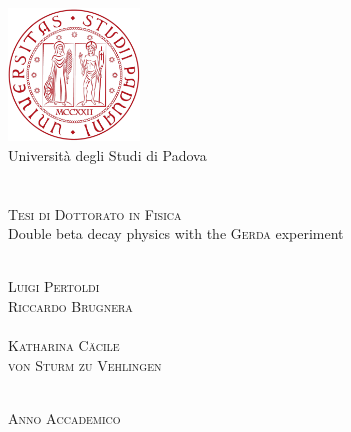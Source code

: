 \begin{titlepage}
  \thispagestyle{empty}
  \begin{center}
  \includegraphics[width=3.5cm]{img/unipd-logo.pdf} \\
  \vspace{0.5cm}
  {\Large Universit\`a degli Studi di Padova} \\
  \hrulefill \\
   \\
  \vspace{2cm}
  \textsc{\large Tesi di Dottorato in Fisica} \\
  \vspace{3cm}
  \huge{Double beta decay physics with the \textsc{Gerda} experiment}
  \end{center}
  \vspace{3cm}
  \begin{multicols}{2}
  \large
  \noindent
   \\
  \textsc{Luigi Pertoldi}
  \columnbreak
  \flushright
   \\
  \textsc{Riccardo Brugnera} \\
  \vspace{5mm}
   \\
  \textsc{Katharina Cäcile\\von Sturm zu Vehlingen}
  \end{multicols}
  \vspace*{\fill}
  \begin{center}
  \hrulefill \\
  \textsc{Anno Accademico }
  \end{center}
\end{titlepage}
\restoregeometry
